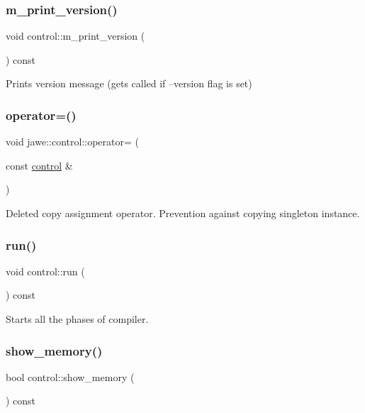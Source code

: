 \subsubsection{\texorpdfstring{m\+\_\+print\+\_\+version()}{m\_print\_version()}}
{\footnotesize\ttfamily void control\+::m\+\_\+print\+\_\+version (\begin{DoxyParamCaption}{ }\end{DoxyParamCaption}) const\hspace{0.3cm}{\ttfamily [private]}}

Prints version message (gets called if --version flag is set) \mbox{\label{classjawe_1_1control_ae93188db9e9ff6f31820b65338170743}} 
\subsubsection{\texorpdfstring{operator=()}{operator=()}}
{\footnotesize\ttfamily void jawe\+::control\+::operator= (\begin{DoxyParamCaption}\item[{const \hyperlink{classjawe_1_1control}{control} \&}]{ }\end{DoxyParamCaption})\hspace{0.3cm}{\ttfamily [delete]}}

Deleted copy assignment operator. Prevention against copying singleton instance. \mbox{\label{classjawe_1_1control_aedf6bf138a9ef62d589458b65f62eae5}} 
\subsubsection{\texorpdfstring{run()}{run()}}
{\footnotesize\ttfamily void control\+::run (\begin{DoxyParamCaption}{ }\end{DoxyParamCaption}) const}

Starts all the phases of compiler. \mbox{\label{classjawe_1_1control_a504da571a1eeb32bf9c9b5957dca5ae1}} 
\subsubsection{\texorpdfstring{show\+\_\+memory()}{show\_memory()}}
{\footnotesize\ttfamily bool control\+::show\+\_\+memory (\begin{DoxyParamCaption}{ }\end{DoxyParamCaption}) const}

